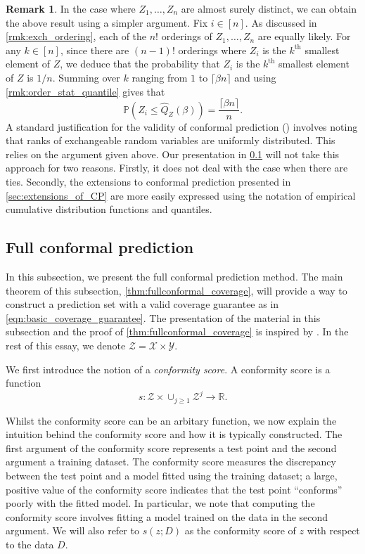 \documentclass[11pt, titlepage]{article} %
\newcommand{\Prob}[1]{\mathbb{P}\left( #1 \right)}
\numberwithin{equation}{section}
\theoremstyle{definition}
\newtheorem{remark}{Remark}
\numberwithin{theorem}{section}
\numberwithin{lemma}{section}
\numberwithin{corollary}{section}
\numberwithin{proposition}{section}
\numberwithin{definition}{section}
\numberwithin{remark}{section}
\begin{document}
\begin{remark}
    In the case where \(Z_1, \ldots, Z_n\) are almost surely distinct, we can obtain the above result using a simpler argument. Fix \(i \in [n]\). As discussed in \cref{rmk:exch_ordering}, each of the \(n!\) orderings of \(Z_1, \ldots, Z_n\) are equally likely. For any \(k \in [n]\), since there are \((n-1)!\) orderings where \(Z_i\) is the \(k^\mathrm{th}\) smallest element of \(Z\), we deduce that the probability that \(Z_i\) is the \(k^\mathrm{th}\) smallest element of \(Z\) is \(1/n\). Summing over \(k\) ranging from \(1\) to \(\lceil \beta n \rceil\) and using \cref{rmk:order_stat_quantile} gives that \[\Prob{Z_i \leq \hat{Q}_Z(\beta)} = \frac{\lceil{\beta n}\rceil}{n}.\] A standard justification for the validity of conformal prediction (\cite{lei2018,angelopoulos2021gentle}) involves noting that ranks of exchangeable random variables are uniformly distributed. This relies on the argument given above. Our presentation in \cref{subsec:fullconformal} will not take this approach for two reasons. Firstly, it does not deal with the case when there are ties. Secondly, the extensions to conformal prediction presented in \cref{sec:extensions_of_CP} are more easily expressed using the notation of empirical cumulative distribution functions and quantiles.
\label{rmk:exch_rank_argument}
\end{remark}

\subsection{Full conformal prediction}
\label{subsec:fullconformal}

In this subsection, we present the full conformal prediction method. The main theorem of this subsection, \cref{thm:fullconformal_coverage}, will provide a way to construct a prediction set with a valid coverage guarantee as in \eqref{eqn:basic_coverage_guarantee}. The presentation of the material in this subsection and the proof of \cref{thm:fullconformal_coverage} is inspired by \cite{angelopoulos2024theoreticalfoundationsconformalprediction}. In the rest of this essay, we denote \(\mathcal{Z} = \mathcal{X} \times \mathcal{Y}\). \vskip5pt

\noindent
We first introduce the notion of a \textit{conformity score}. A conformity score is a function \[s:\mathcal{Z} \times \cup_{j \geq 1} \mathcal{Z}^j \to \mathbb{R}.\]

\noindent
Whilst the conformity score can be an arbitary function, we now explain the intuition behind the conformity score and how it is typically constructed. The first argument of the conformity score represents a test point and the second argument a training dataset. The conformity score measures the discrepancy between the test point and a model fitted using the training dataset; a large, positive value of the conformity score indicates that the test point ``conforms'' poorly with the fitted model. In particular, we note that computing the conformity score involves fitting a model trained on the data in the second argument. We will also refer to \(s(z;D)\) as the conformity score of \(z\) with respect to the data \(D\).
\end{document}
